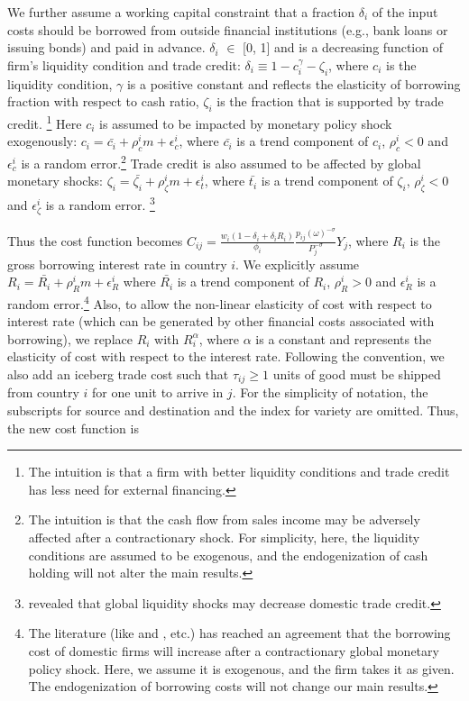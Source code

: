 We further assume a working capital constraint that a fraction $\delta_i$ of the input costs should be borrowed from outside financial institutions (e.g., bank loans or issuing bonds) and paid in advance. $\delta_i$ $\in$ [0, 1] and is a decreasing function of firm's liquidity condition and trade credit: $\delta_i \equiv 1-c_i^\gamma-\zeta_i$, where $c_i$ is the liquidity condition, $\gamma$ is a positive constant and reflects the elasticity of borrowing fraction with respect to cash ratio, $\zeta_i$ is the fraction that is supported by trade credit. \footnote{The intuition is that a firm with better liquidity conditions and trade credit has less need for external financing.} Here $c_i$ is assumed to be impacted by monetary policy shock exogenously: $c_i=\bar{c_i}+\rho_c^i m+\epsilon_c^i$, where $\bar{c_i}$ is a trend component of $c_i$, $\rho_c^i<0$ and $\epsilon_c^i$ is a random error.\footnote{The intuition is that the cash flow from sales income may be adversely affected after a contractionary shock. For simplicity, here, the liquidity conditions are assumed to be exogenous, and the endogenization of cash holding will not alter the main results.} Trade credit is also assumed to be affected by global monetary shocks: $\zeta_i=\bar{\zeta_i}+\rho_\zeta^i m+\epsilon_t^i$, where $\bar{t_i}$ is a trend component of $\zeta_i$, $\rho_\zeta^i<0$ and $\epsilon_\zeta^i$ is a random error. \footnote{\cite{lin2018foreign} revealed that global liquidity shocks may decrease domestic trade credit.} 

Thus the cost function becomes $ C_{ij}=\frac{w_i(1-\delta_i+\delta_i R_i)}{\phi_i} \frac{p_{ij}(\omega)^{-\sigma}}{P_j^{-\sigma}} Y_j$, where $R_i$ is the gross borrowing interest rate in country $i$. We explicitly assume $R_i=\bar{R_i}+\rho_R^i m+\epsilon_R^i$ where $\bar{R_i}$ is a trend component of $R_i$, $\rho_R^i>0$ and $\epsilon_R^i$ is a random error.\footnote{The literature (like \cite{georgiadis2016determinants} and \cite{miranda2020us}, etc.) has reached an agreement that the borrowing cost of domestic firms will increase after a contractionary global monetary policy shock. Here, we assume it is exogenous, and the firm takes it as given. The endogenization of borrowing costs will not change our main results.} Also, to allow the non-linear elasticity of cost with respect to interest rate (which can be generated by other financial costs associated with borrowing), we replace $R_i$ with $R_i^\alpha$, where $\alpha$ is a constant and represents the elasticity of cost with respect to the interest rate. Following the convention, we also add an iceberg trade cost such that $\tau_{ij}\geq1$ units of good must be shipped from country $i$ for one unit to arrive in $j$. For the simplicity of notation, the subscripts for source and destination and the index for variety are omitted. Thus, the new cost function is

